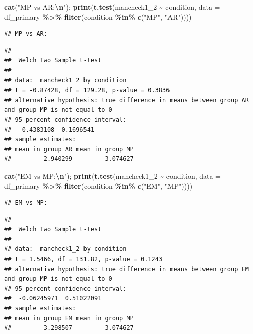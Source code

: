 \documentclass[
]{article}
\newenvironment{Shaded}{\begin{snugshade}}{\end{snugshade}}
\newcommand{\AttributeTok}[1]{\textcolor[rgb]{0.13,0.29,0.53}{#1}}
\newcommand{\FunctionTok}[1]{\textcolor[rgb]{0.13,0.29,0.53}{\textbf{#1}}}
\newcommand{\NormalTok}[1]{#1}
\newcommand{\SpecialCharTok}[1]{\textcolor[rgb]{0.81,0.36,0.00}{\textbf{#1}}}
\newcommand{\StringTok}[1]{\textcolor[rgb]{0.31,0.60,0.02}{#1}}
\begin{document}
\begin{Shaded}
\begin{Highlighting}[]
\FunctionTok{cat}\NormalTok{(}\StringTok{"MP vs AR:}\SpecialCharTok{\textbackslash{}n}\StringTok{"}\NormalTok{); }\FunctionTok{print}\NormalTok{(}\FunctionTok{t.test}\NormalTok{(mancheck1\_2 }\SpecialCharTok{\textasciitilde{}}\NormalTok{ condition, }
       \AttributeTok{data =}\NormalTok{ df\_primary }\SpecialCharTok{\%\textgreater{}\%} \FunctionTok{filter}\NormalTok{(condition }\SpecialCharTok{\%in\%} \FunctionTok{c}\NormalTok{(}\StringTok{"MP"}\NormalTok{, }\StringTok{"AR"}\NormalTok{))))}
\end{Highlighting}
\end{Shaded}

\begin{verbatim}
## MP vs AR:
\end{verbatim}

\begin{verbatim}
## 
##  Welch Two Sample t-test
## 
## data:  mancheck1_2 by condition
## t = -0.87428, df = 129.28, p-value = 0.3836
## alternative hypothesis: true difference in means between group AR and group MP is not equal to 0
## 95 percent confidence interval:
##  -0.4383108  0.1696541
## sample estimates:
## mean in group AR mean in group MP 
##         2.940299         3.074627
\end{verbatim}

\begin{Shaded}
\begin{Highlighting}[]
\FunctionTok{cat}\NormalTok{(}\StringTok{"EM vs MP:}\SpecialCharTok{\textbackslash{}n}\StringTok{"}\NormalTok{); }\FunctionTok{print}\NormalTok{(}\FunctionTok{t.test}\NormalTok{(mancheck1\_2 }\SpecialCharTok{\textasciitilde{}}\NormalTok{ condition, }
       \AttributeTok{data =}\NormalTok{ df\_primary }\SpecialCharTok{\%\textgreater{}\%} \FunctionTok{filter}\NormalTok{(condition }\SpecialCharTok{\%in\%} \FunctionTok{c}\NormalTok{(}\StringTok{"EM"}\NormalTok{, }\StringTok{"MP"}\NormalTok{))))}
\end{Highlighting}
\end{Shaded}

\begin{verbatim}
## EM vs MP:
\end{verbatim}

\begin{verbatim}
## 
##  Welch Two Sample t-test
## 
## data:  mancheck1_2 by condition
## t = 1.5466, df = 131.82, p-value = 0.1243
## alternative hypothesis: true difference in means between group EM and group MP is not equal to 0
## 95 percent confidence interval:
##  -0.06245971  0.51022091
## sample estimates:
## mean in group EM mean in group MP 
##         3.298507         3.074627
\end{verbatim}
\end{document}
